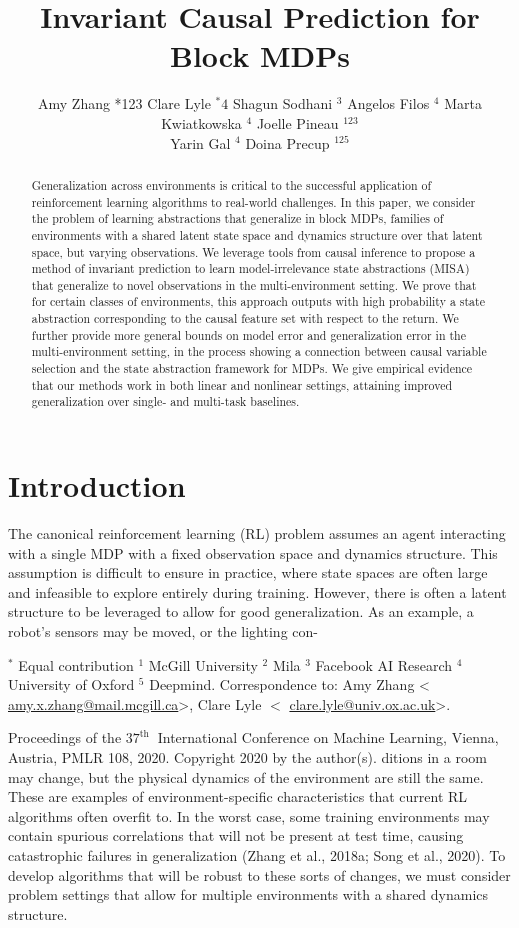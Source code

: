 \documentclass[10pt]{article}
\title{Invariant Causal Prediction for Block MDPs }
\author{Amy Zhang *123 Clare Lyle $^{*} 4$ Shagun Sodhani $^{3}$ Angelos Filos $^{4}$ Marta Kwiatkowska $^{4}$ Joelle Pineau $^{123}$\\
Yarin Gal $^{4}$ Doina Precup ${ }^{125}$}
\date{}
\begin{document}
\maketitle


\begin{abstract}
Generalization across environments is critical to the successful application of reinforcement learning algorithms to real-world challenges. In this paper, we consider the problem of learning abstractions that generalize in block MDPs, families of environments with a shared latent state space and dynamics structure over that latent space, but varying observations. We leverage tools from causal inference to propose a method of invariant prediction to learn model-irrelevance state abstractions (MISA) that generalize to novel observations in the multi-environment setting. We prove that for certain classes of environments, this approach outputs with high probability a state abstraction corresponding to the causal feature set with respect to the return. We further provide more general bounds on model error and generalization error in the multi-environment setting, in the process showing a connection between causal variable selection and the state abstraction framework for MDPs. We give empirical evidence that our methods work in both linear and nonlinear settings, attaining improved generalization over single- and multi-task baselines.
\end{abstract}

\section{Introduction}
The canonical reinforcement learning (RL) problem assumes an agent interacting with a single MDP with a fixed observation space and dynamics structure. This assumption is difficult to ensure in practice, where state spaces are often large and infeasible to explore entirely during training. However, there is often a latent structure to be leveraged to allow for good generalization. As an example, a robot's sensors may be moved, or the lighting con-

${ }^{*}$ Equal contribution ${ }^{1}$ McGill University ${ }^{2}$ Mila ${ }^{3}$ Facebook AI Research ${ }^{4}$ University of Oxford ${ }^{5}$ Deepmind. Correspondence to: Amy Zhang < \href{mailto:amy.x.zhang@mail.mcgill.ca}{amy.x.zhang@mail.mcgill.ca}>, Clare Lyle $<$ \href{mailto:clare.lyle@univ.ox.ac.uk}{clare.lyle@univ.ox.ac.uk}>.

Proceedings of the $37^{\text {th }}$ International Conference on Machine Learning, Vienna, Austria, PMLR 108, 2020. Copyright 2020 by the author(s). ditions in a room may change, but the physical dynamics of the environment are still the same. These are examples of environment-specific characteristics that current RL algorithms often overfit to. In the worst case, some training environments may contain spurious correlations that will not be present at test time, causing catastrophic failures in generalization (Zhang et al., 2018a; Song et al., 2020). To develop algorithms that will be robust to these sorts of changes, we must consider problem settings that allow for multiple environments with a shared dynamics structure.
\end{document}
